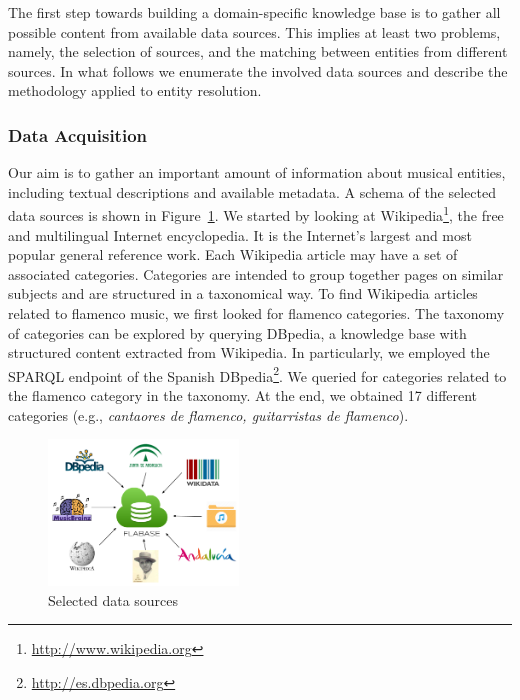 The first step towards building a domain-specific knowledge base is to gather all possible content from available data sources. This implies at least two problems, namely, the selection of sources, and the matching between entities from different sources. In what follows we enumerate the involved data sources and describe the methodology applied to entity resolution.

\subsubsection{Data Acquisition}\label{sec:musicology:datasoruces}

Our aim is to gather an important amount of information about musical entities, including textual descriptions and available metadata. A schema of the selected data sources is shown in Figure~\ref{fig:musicology:datasources}. We started by looking at Wikipedia\footnote{\url{http://www.wikipedia.org}}, the free and multilingual Internet encyclopedia. It is the Internet's largest and most popular general reference work. Each Wikipedia article may have a set of associated categories. Categories are intended to group together pages on similar subjects and are structured in a taxonomical way. To find Wikipedia articles related to flamenco music, we first looked for flamenco categories. The taxonomy of categories can be explored by querying DBpedia, a knowledge base with structured content extracted from Wikipedia. In particularly, we employed the SPARQL endpoint of the Spanish DBpedia\footnote{\url{http://es.dbpedia.org}}. We queried for categories related to the flamenco category in the taxonomy. At the end, we obtained 17 different categories (e.g., \textit{cantaores de flamenco, guitarristas de flamenco}).

\begin{figure}
	\centering
	\includegraphics[width=0.45\textwidth]{ch05_musicology_pics/datasources.png}
	\caption{Selected data sources \label{fig:musicology:datasources}}
\end{figure}

